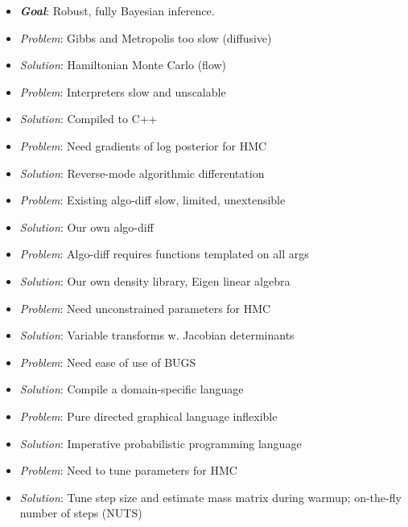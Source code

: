 \documentclass[10pt]{report}
\begin{document}
%
\begin{itemize}
\item {\slshape\bfseries Goal}: Robust, fully Bayesian inference.
\end{itemize}
%
\vspace*{2pt}
\begin{itemize}
\item {\slshape Problem}: Gibbs and Metropolis too slow (diffusive)
\item {\slshape Solution}: Hamiltonian Monte Carlo (flow)
%
\vspace*{8pt}
\item {\slshape Problem}:  Interpreters slow and unscalable
\item {\slshape Solution}: Compiled to C++
%
\vspace*{8pt}
\item {\slshape Problem}:  Need gradients of log posterior for HMC
\item {\slshape Solution}: Reverse-mode algorithmic differentation
\end{itemize}


%
\begin{itemize}
\item {\slshape Problem}:  Existing algo-diff slow, limited, unextensible
\item {\slshape Solution}: Our own algo-diff
%
\vspace*{8pt}
\item {\slshape Problem}:  Algo-diff requires functions templated on
  all args
\item {\slshape Solution}: Our own density library, Eigen linear
 algebra
%
\vspace*{8pt}
\item {\slshape Problem}:  Need unconstrained parameters for HMC
\item {\slshape Solution}: Variable transforms w. Jacobian determinants
%
\end{itemize}


%
\begin{itemize}
\item {\slshape Problem}:  Need ease of use of BUGS
\item {\slshape Solution}: Compile a domain-specific language
%
\vspace*{8pt}
\item {\slshape Problem}:  Pure directed graphical language inflexible
\item {\slshape Solution}: Imperative probabilistic programming
  language
\vspace*{8pt}
\item {\slshape Problem}:  Need to tune parameters for HMC
\item {\slshape Solution}: Tune step size and estimate mass matrix
  during warmup;  on-the-fly number of steps (NUTS)
%
\end{itemize}
\end{document}
